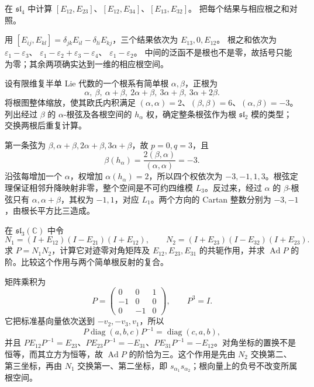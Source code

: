 \begin{exercise}\label{b5:ex:16-root-brackets}
	在 \(\mathfrak{sl}_4\) 中计算 \([E_{12},E_{23}]\)、\([E_{12},E_{34}]\)、\([E_{13},E_{32}]\)。 把每个结果与相应根之和对照。
\end{exercise}
\begin{solution}
	用 \([E_{ij},E_{kl}]=\delta_{jk}E_{il}-\delta_{li}E_{kj}\)，三个结果依次为 \(E_{13},0,E_{12}\)。 根之和依次为 \(\varepsilon_1-\varepsilon_3\)、 \(\varepsilon_1-\varepsilon_2+\varepsilon_3-\varepsilon_4\)、 \(\varepsilon_1-\varepsilon_2\)。 中间的泛函不是根也不是零，故括号只能为零；其余两项确实达到一维的相应根空间。
\end{solution}

\begin{exercise}\label{b5:ex:16-b2-string}
	设有限维复半单 Lie 代数的一个根系有简单根 \(\alpha,\beta\)，正根为
	\[
		\alpha,\ \beta,\ \alpha+\beta,\ 2\alpha+\beta, \ 3\alpha+\beta,\ 3\alpha+2\beta.
	\]
	将根图整体缩放，使其欧氏内积满足 \((\alpha,\alpha)=2\)、\((\beta,\beta)=6\)、\((\alpha,\beta)=-3\)。 列出经过 \(\beta\) 的 \(\alpha\)-根弦及各根空间的 \(h_\alpha\) 权，确定整条根弦作为根 \(\mathfrak{sl}_2\) 模的类型；交换两根后重复计算。
\end{exercise}
\begin{solution}
	第一条弦为 \(\beta,\alpha+\beta,2\alpha+\beta,3\alpha+\beta\)，故 \(p=0,q=3\)，且
	\[
		\beta(h_\alpha)=\frac{2(\beta,\alpha)}{(\alpha,\alpha)}=-3.
	\]
	沿弦每增加一个 \(\alpha\)，权增加 \(\alpha(h_\alpha)=2\)，所以四个权依次为 \(-3,-1,1,3\)。根弦定理保证相邻升降映射非零，整个空间是不可约四维模 \(L_3\)。反过来，经过 \(\alpha\) 的 \(\beta\)-根弦只有 \(\alpha,\alpha+\beta\)，其权为 \(-1,1\)，对应 \(L_1\)。两个方向的 Cartan 整数分别为 \(-3,-1\)，由根长平方比三造成。
\end{solution}

\begin{exercise}\label{b5:ex:16-sl2-normalizer}
	在 \(\mathfrak{sl}_3(\mathbb C)\) 中令
	\[
		N_1=(I+E_{12})(I-E_{21})(I+E_{12}),\qquad N_2=(I+E_{23})(I-E_{32})(I+E_{23}).
	\]
	求 \(P=N_1N_2\)，计算它对迹零对角矩阵及 \(E_{12},E_{23},E_{31}\) 的共轭作用，并求 \(\operatorname{Ad}P\) 的阶。比较这个作用与两个简单根反射的复合。
\end{exercise}
\begin{solution}
	矩阵乘积为
	\[
		P=\begin{pmatrix}0&0&1\\-1&0&0\\0&-1&0\end{pmatrix},
		\qquad P^3=I.
	\]
	它把标准基向量依次送到 \(-v_2,-v_3,v_1\)，所以
	\[
		P\operatorname{diag}(a,b,c)P^{-1}=\operatorname{diag}(c,a,b),
	\]
	并且 \(PE_{12}P^{-1}=E_{23}\)、\(PE_{23}P^{-1}=-E_{31}\)、\(PE_{31}P^{-1}=-E_{12}\)。对角坐标的置换不是恒等，而其立方为恒等，故 \(\operatorname{Ad}P\) 的阶恰为三。这个作用是先由 \(N_2\) 交换第二、第三坐标，再由 \(N_1\) 交换第一、第二坐标，即 \(s_{\alpha_1}s_{\alpha_2}\)；根向量上的负号不改变所属根空间。
\end{solution}

